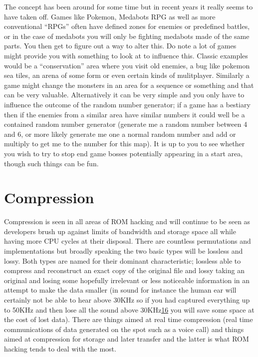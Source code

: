 \documentclass[
]{book}
\begin{document}
The concept has been around for some time but in recent years it really seems to have taken off. Games like Pokemon, Medabots RPG as well as more conventional ``RPGs'' often have defined zones for enemies or predefined battles, or in the case of medabots you will only be fighting medabots made of the same parts. You then get to figure out a way to alter this. Do note a lot of games might provide you with something to look at to influence this. Classic examples would be a ``conservation'' area where you visit old enemies, a bug like pokemon sea tiles, an arena of some form or even certain kinds of mulitplayer. Similarly a game might change the monsters in an area for a sequence or something and that can be very valuable. Alternatively it can be very simple and you only have to influence the outcome of the random number generator; if a game has a bestiary then if the enemies from a similar area have similar numbers it could well be a contained random number generator (generate me a random number between 4 and 6, or more likely generate me one a normal random number and add or multiply to get me to the number for this map). It is up to you to see whether you wish to try to stop end game bosses potentially appearing in a start area, though such things can be fun.

\hypertarget{compression-1}{%
\section{Compression}\label{compression-1}}

Compression is seen in all areas of ROM hacking and will continue to be seen as developers brush up against limits of bandwidth and storage space all while having more CPU cycles at their disposal. There are countless permutations and implementations but broadly speaking the two basic types will be lossless and lossy. Both types are named for their dominant characteristic; lossless able to compress and reconstruct an exact copy of the original file and lossy taking an original and losing some hopefully irrelevant or less noticeable information in an attempt to make the data smaller (in sound for instance the human ear will certainly not be able to hear above 30KHz so if you had captured everything up to 50KHz and then lose all the sound above 30KHz\href{romhacking202017.html\#fn16x0}{16} you will save some space at the cost of lost data). There are things aimed at real time compression (real time communications of data generated on the spot such as a voice call) and things aimed at compression for storage and later transfer and the latter is what ROM hacking tends to deal with the most.
\end{document}
